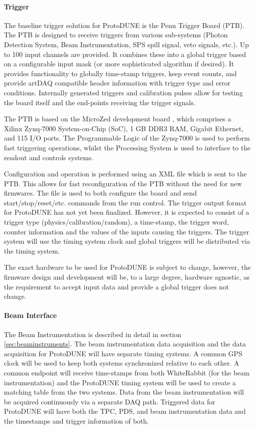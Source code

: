 \paragraph{Trigger}

The baseline trigger solution for ProtoDUNE is the Penn Trigger Board
(PTB). The PTB is designed to receive triggers from various sub-systems
(Photon Detection System, Beam Instrumentation, SPS spill signal, veto
signals, etc.).  Up to 100 input channels are provided.  It combines
these into a global trigger based on a configurable input mask (or
more sophisticated algorithm if desired).  It provides functionality
to globally time-stamp triggers, keep event counts, and provide artDAQ
compatible header information with trigger type and error conditions.
Internally generated triggers and calibration pulses allow for testing
the board itself and the end-points receiving the trigger signals.

The PTB is based on the MicroZed development board \cite{avnet:microzed}, which comprises a
Xilinx Zynq-7000 System-on-Chip (SoC), 1 GB DDR3 RAM, Gigabit Ethernet,
and 115 I/O ports.  The Programmable Logic of the Zynq-7000 is used to
perform fast triggering operations, whilst the Processing System is used
to interface to the readout and controls systems.

Configuration and operation is performed using an XML file which is sent
to the PTB.  This allows for fast reconfiguration of the PTB without
the need for new firmwares.  The file is used to both configure the board
and send start/stop/reset/etc. commands from the run control.
The trigger output format for ProtoDUNE has not yet been finalized.  
However, it is expected to consist of a trigger type (physics/calibration/random),
a time-stamp, the trigger word, counter information and the values 
of the inputs causing the triggers.  
The trigger system will use the timing system clock and global triggers will be
distributed via the timing system.  

The exact hardware to be used for ProtoDUNE is subject to change, 
however, the firmware design and development will be, to a large degree, hardware
agnostic, as the requirement to accept input data and provide a global trigger 
does not change.  

\paragraph{Beam Interface}

The Beam Instrumentation is described in detail in section \ref{sec:beaminstruments}.
The beam instrumentation data acquisition and the data acquisition for ProtoDUNE
will have separate timing systems.  A common GPS clock will be used to keep both
systems synchronized relative to each other.  A common endpoint will receive time-stamps 
from both WhiteRabbit (for the beam instrumentation) and the ProtoDUNE timing system
will be used to create a matching table from the two systems.  Data from the beam
instrumentation will be acquired continuously via a separate DAQ path.  Triggered
data for ProtoDUNE will have both the TPC, PDS, and beam instrumentation data and 
the timestamps and trigger information of both.

